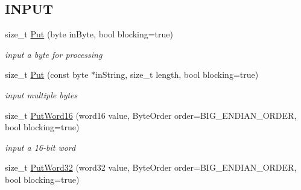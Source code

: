 \subsection*{INPUT}
\label{_amgrpa84cc046d48610b05c21fd3670d0c829}
 \begin{DoxyCompactItemize}
\item 
\hypertarget{class_buffered_transformation_ae70658b0d271f8e114ac6c3cc9774ede}{
size\_\-t \hyperlink{class_buffered_transformation_ae70658b0d271f8e114ac6c3cc9774ede}{Put} (byte inByte, bool blocking=true)}
\label{class_buffered_transformation_ae70658b0d271f8e114ac6c3cc9774ede}

\begin{DoxyCompactList}\small\item\em input a byte for processing \item\end{DoxyCompactList}\item 
\hypertarget{class_buffered_transformation_a44e935e60d3877975a7c82c6353d65c9}{
size\_\-t \hyperlink{class_buffered_transformation_a44e935e60d3877975a7c82c6353d65c9}{Put} (const byte $\ast$inString, size\_\-t length, bool blocking=true)}
\label{class_buffered_transformation_a44e935e60d3877975a7c82c6353d65c9}

\begin{DoxyCompactList}\small\item\em input multiple bytes \item\end{DoxyCompactList}\item 
\hypertarget{class_buffered_transformation_a92c60616792d7bce5cd41eaffbd1c3cc}{
size\_\-t \hyperlink{class_buffered_transformation_a92c60616792d7bce5cd41eaffbd1c3cc}{PutWord16} (word16 value, ByteOrder order=BIG\_\-ENDIAN\_\-ORDER, bool blocking=true)}
\label{class_buffered_transformation_a92c60616792d7bce5cd41eaffbd1c3cc}

\begin{DoxyCompactList}\small\item\em input a 16-\/bit word \item\end{DoxyCompactList}\item 
\hypertarget{class_buffered_transformation_affcc574867d51528afe3c96721ded075}{
size\_\-t \hyperlink{class_buffered_transformation_affcc574867d51528afe3c96721ded075}{PutWord32} (word32 value, ByteOrder order=BIG\_\-ENDIAN\_\-ORDER, bool blocking=true)}
\label{class_buffered_transformation_affcc574867d51528afe3c96721ded075}


\end{DoxyCompactItemize}

